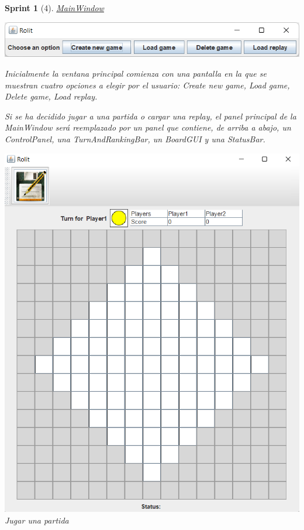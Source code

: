 \documentclass[12pt,a4paper,openright]{book}
\theoremstyle{break}
\newtheorem*{sprint}{Sprint}
\begin{document}
\begin{sprint}[4]
\underline{MainWindow}
\begin{center}
\includegraphics[scale=0.8]{menu-sprint3.png}
\end{center}

Inicialmente la ventana principal comienza con una pantalla en la que se muestran cuatro opciones a elegir por el usuario: \textit{Create new game, Load game, Delete game, Load replay}.

Si se ha decidido jugar a una partida o cargar una replay, el panel principal de la \textit{MainWindow} será reemplazado por un panel que contiene, de arriba a abajo, un ControlPanel, una TurnAndRankingBar, un BoardGUI y una StatusBar.

\begin{center}
\includegraphics[scale=0.9]{game-sprint3.png}
Jugar una partida
\end{center}


\end{sprint}
\end{document}
